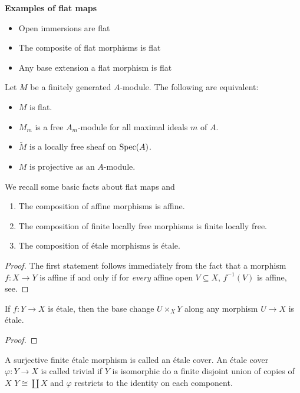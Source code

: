 \textbf{Examples of flat maps}
  \begin{itemize}
    \item Open immersions are flat
    \item The composite of flat morphisms is flat
    \item Any base extension a flat morphism is flat
  \end{itemize}

\begin{theorem}
  Let $M$ be a finitely generated $A$-module. The following are equivalent:
  \begin{itemize}
    \item $M$ is flat.
    \item $M_m$ is a free $A_m$-module for all maximal ideals $m$ of $A$.
    \item $\widetilde{M}$ is a locally free sheaf on $\operatorname{Spec}(A)$.
    \item $M$ is projective as an $A$-module.
  \end{itemize}
\end{theorem}

We recall some basic facts about flat maps and 
\begin{lemma}
  \begin{enumerate}
    \item The composition of affine morphisms is affine.
    \item The composition of finite locally free morphisms is finite locally free.
    \item The composition of \'etale morphisms is \'etale.
  \end{enumerate}
\end{lemma}

\begin{proof}
  The first statement follows immediately from the fact that a morphism $f: X \to Y$ is affine if and only if for \textit{every} affine open $V \subseteq X$, $f^{-1}(V)$ is affine, see\cite{Hartshorne}.
\end{proof}

\begin{lemma}
  If $f: Y \to X$ is \'etale, then the base change $U \times_X Y$ along any morphism $U \to X$ is \'etale.
\end{lemma}

\begin{proof}
  
\end{proof}

\begin{definition}
  A surjective finite \'etale morphism is called an \'etale cover. An \'etale cover $\varphi : Y \to X$ is called trivial if $Y$ is isomorphic do a finite disjoint union of copies of $X$ $Y \cong \coprod X$ and $\varphi$ restricts to the identity on each component.
\end{definition}

